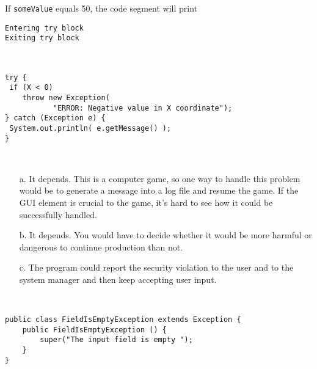 \begin{ANS}
\item  If {\tt someValue} equals 50, the code segment will print

\begin{jjjlisting}
\begin{lstlisting}
Entering try block
Exiting try block
\end{lstlisting}
\end{jjjlisting}

\item  \mbox{ }

\begin{jjjlisting}
\begin{lstlisting}
try {
 if (X < 0)
    throw new Exception(
           "ERROR: Negative value in X coordinate");
} catch (Exception e) {
 System.out.println( e.getMessage() );
}
\end{lstlisting}
\end{jjjlisting}

\item  \mbox{ }

\begin{enumerate}
\item[a.]  It depends.  This is a computer game, so one way to handle
this problem would be to generate a message into a log file and resume
the game.  If the GUI element is crucial to the game, it's hard
to see how it could be successfully handled.

\item[b.]  It depends.  You would have to decide whether it would be
more harmful or dangerous to continue production than not.

\item[c.]  The program could report the security violation to the
user and to the system manager and then keep accepting user input.

\end{enumerate}

\item  \mbox{ }

\begin{jjjlisting}
\begin{lstlisting}
public class FieldIsEmptyException extends Exception {
    public FieldIsEmptyException () {
        super("The input field is empty ");
    }
}
\end{lstlisting}
\end{jjjlisting}

\item  \mbox{ }


\end{ANS}
